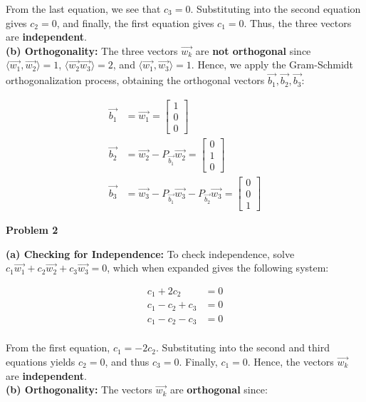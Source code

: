 \documentclass[letterpaper,11pt]{article}
\newcommand{\problem}[1]{
    \vspace{10pt}\textbf{\Large Problem #1}\\\vspace{-5pt}
}
\begin{document}
From the last equation, we see that $c_3 = 0$. Substituting into the second equation gives $c_2 = 0$, and finally, the first equation gives $c_1 = 0$.  
Thus, the three vectors are \textbf{independent}. \\

\textbf{(b) Orthogonality:}  
The three vectors $\vec{w_k}$ are \textbf{not orthogonal} since $\langle \vec{w_1}, \vec{w_2} \rangle = 1$, $\langle \vec{w_2}\vec{w_3} \rangle = 2$, and $\langle \vec{w_1}, \vec{w_3} \rangle = 1$. 
Hence, we apply the Gram-Schmidt orthogonalization process, obtaining the orthogonal vectors $\vec{b_1}, \vec{b_2}, \vec{b_3}$:

\begin{align*}
    \vec{b_1} &= \vec{w_1} = \begin{bmatrix} 1 \\ 0 \\ 0 \end{bmatrix} \\
    \vec{b_2} &= \vec{w_2} - P_{\vec{b_1}} \vec{w_2} = \begin{bmatrix} 0 \\ 1 \\ 0 \end{bmatrix} \\
    \vec{b_3} &= \vec{w_3} - P_{\vec{b_1}} \vec{w_3} - P_{\vec{b_2}} \vec{w_3} = \begin{bmatrix} 0 \\ 0 \\ 1 \end{bmatrix}
\end{align*}

\problem{2}

\textbf{(a) Checking for Independence:}  
To check independence, solve $c_1 \vec{w_1} + c_2 \vec{w_2} + c_3 \vec{w_3} = 0$, which when expanded gives the following system:

\begin{align*}
    c_1 + 2c_2 &= 0 \\
    c_1 - c_2 + c_3 &= 0 \\
    c_1 - c_2 - c_3 &= 0 \\
\end{align*}

From the first equation, $c_1 = -2c_2$. Substituting into the second and third equations yields $c_2 = 0$, and thus $c_3 = 0$. Finally, $c_1 = 0$.  
Hence, the vectors $\vec{w_k}$ are \textbf{independent}. \\

\textbf{(b) Orthogonality:}  
The vectors $\vec{w_k}$ are \textbf{orthogonal} since:
\end{document}
